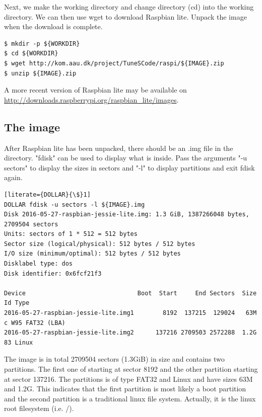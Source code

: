 Next, we make the working directory and change directory (cd) into the working
directory. We can then use wget to download Raspbian lite. Unpack the image
when the download is complete.

\begin{lstlisting}[]
$ mkdir -p ${WORKDIR}
$ cd ${WORKDIR}
$ wget http://kom.aau.dk/project/TuneSCode/raspi/${IMAGE}.zip
$ unzip ${IMAGE}.zip
\end{lstlisting}
\FloatBarrier
\vspace{-5mm}

A more recent version of Raspbian lite may be available on 
\url{http://downloads.raspberrypi.org/raspbian_lite/images}.

\subsection{The image}

After Raspbian lite has been unpacked, there should be an .img file in the directory.
"fdisk" can be used to display what is inside. Pass the arguments "-u sectors" to
display the sizes in sectors and "-l" to display partitions and exit fdisk again.

\begin{lstlisting}[literate={DOLLAR}{\$}1]
DOLLAR fdisk -u sectors -l ${IMAGE}.img
Disk 2016-05-27-raspbian-jessie-lite.img: 1.3 GiB, 1387266048 bytes, 2709504 sectors
Units: sectors of 1 * 512 = 512 bytes
Sector size (logical/physical): 512 bytes / 512 bytes
I/O size (minimum/optimal): 512 bytes / 512 bytes
Disklabel type: dos
Disk identifier: 0x6fcf21f3

Device                               Boot  Start     End Sectors  Size Id Type
2016-05-27-raspbian-jessie-lite.img1        8192  137215  129024   63M  c W95 FAT32 (LBA)
2016-05-27-raspbian-jessie-lite.img2      137216 2709503 2572288  1.2G 83 Linux
\end{lstlisting}
\FloatBarrier

The image is in total 2709504 sectors (1.3GiB) in size and contains two
partitions. The first one of starting at sector 8192 and
the other partition starting at sector 137216. The partitions is of type FAT32
and Linux and have sizes 63M and 1.2G. This indicates that the first partition
is most likely a boot partition and the second partition is a traditional linux file
system. Actually, it is the linux root filesystem (i.e. /).

